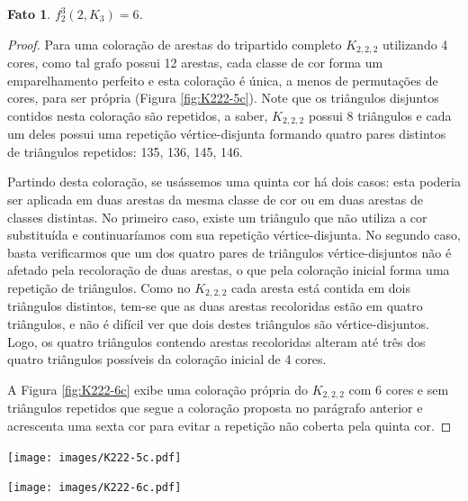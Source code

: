 \documentclass[12pt,a4paper]{book}
\newtheorem{fato}      [teorema] {Fato}
\begin{document}
\begin{fato}
    $f_2^3(2, K_3) = 6$.
\end{fato}
\begin{proof}
    Para uma coloração de arestas do tripartido completo $K_{2,2,2}$ utilizando 4 cores, 
    como tal grafo possui 12 arestas, cada classe de cor forma um emparelhamento perfeito e esta coloração é única, a menos de permutações de cores, para ser própria (Figura \ref{fig:K222-5c}). 
    Note que os triângulos disjuntos contidos nesta coloração são repetidos, a saber, $K_{2,2,2}$ possui 8 triângulos e cada um deles possui uma repetição vértice-disjunta formando quatro pares distintos de triângulos repetidos: 135, 136, 145, 146. 
        
    Partindo desta coloração, se usássemos uma quinta cor há dois casos: esta poderia ser aplicada em duas arestas da mesma classe de cor ou em duas arestas de classes distintas. 
    No primeiro caso, existe um triângulo que não utiliza a cor substituída e continuaríamos com sua repetição vértice-disjunta.
    No segundo caso, basta verificarmos que um dos quatro pares de triângulos vértice-disjuntos não é afetado pela recoloração de duas arestas, o que pela coloração inicial forma uma repetição de triângulos.
    Como no $K_{2,2,2}$ cada aresta está contida em dois triângulos distintos, tem-se que as duas arestas recoloridas estão em quatro triângulos, e não é difícil ver que dois destes triângulos são vértice-disjuntos. 
    Logo, os quatro triângulos contendo arestas recoloridas alteram até três dos quatro triângulos possíveis da coloração inicial de 4 cores.
    
    A Figura \ref{fig:K222-6c} exibe uma coloração própria do $K_{2,2,2}$ com 6 cores e sem triângulos repetidos que segue a coloração proposta no parágrafo anterior e acrescenta uma sexta cor para evitar a repetição não coberta pela quinta cor.
    
\end{proof}

 \begin{center}
			\texttt{[image: images/K222-5c.pdf]}
			\label{fig:K222-5c} 
	\end{center}
  \begin{center}
			\texttt{[image: images/K222-6c.pdf]}
			\label{fig:K222-6c} 
	\end{center}
\end{document}
